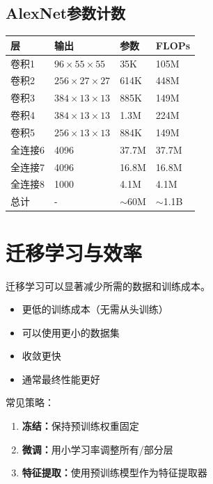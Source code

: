 \subsection{AlexNet参数计数}

\begin{table}[ht]
    \centering
    \begin{tabular}{L{2cm} L{2.5cm} L{2cm} L{2cm}}
        \toprule
        \textbf{层} & \textbf{输出} & \textbf{参数} & \textbf{FLOPs} \\
        \midrule
        卷积1 & $96\times55\times55$ & 35K & 105M \\
        卷积2 & $256\times27\times27$ & 614K & 448M \\
        卷积3 & $384\times13\times13$ & 885K & 149M \\
        卷积4 & $384\times13\times13$ & 1.3M & 224M \\
        卷积5 & $256\times13\times13$ & 884K & 149M \\
        全连接6 & 4096 & 37.7M & 37.7M \\
        全连接7 & 4096 & 16.8M & 16.8M \\
        全连接8 & 1000 & 4.1M & 4.1M \\
        \midrule
        总计 & - & $\sim$60M & $\sim$1.1B \\
        \bottomrule
    \end{tabular}
\end{table}

\section{迁移学习与效率}

迁移学习可以显著减少所需的数据和训练成本。

\begin{properties}[迁移学习的优势]
\begin{itemize}
    \item 更低的训练成本（无需从头训练）
    \item 可以使用更小的数据集
    \item 收敛更快
    \item 通常最终性能更好
\end{itemize}
\end{properties}

常见策略：
\begin{enumerate}
    \item \textbf{冻结：}保持预训练权重固定
    \item \textbf{微调：}用小学习率调整所有/部分层
    \item \textbf{特征提取：}使用预训练模型作为特征提取器
\end{enumerate}

